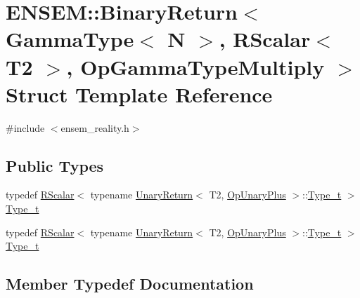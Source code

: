 \hypertarget{structENSEM_1_1BinaryReturn_3_01GammaType_3_01N_01_4_00_01RScalar_3_01T2_01_4_00_01OpGammaTypeMultiply_01_4}{}\section{E\+N\+S\+EM\+:\+:Binary\+Return$<$ Gamma\+Type$<$ N $>$, R\+Scalar$<$ T2 $>$, Op\+Gamma\+Type\+Multiply $>$ Struct Template Reference}
\label{structENSEM_1_1BinaryReturn_3_01GammaType_3_01N_01_4_00_01RScalar_3_01T2_01_4_00_01OpGammaTypeMultiply_01_4}


{\ttfamily \#include $<$ensem\+\_\+reality.\+h$>$}

\subsection*{Public Types}
\begin{DoxyCompactItemize}
\item 
typedef \mbox{\hyperlink{classENSEM_1_1RScalar}{R\+Scalar}}$<$ typename \mbox{\hyperlink{structENSEM_1_1UnaryReturn}{Unary\+Return}}$<$ T2, \mbox{\hyperlink{structENSEM_1_1OpUnaryPlus}{Op\+Unary\+Plus}} $>$\+::\mbox{\hyperlink{structENSEM_1_1BinaryReturn_3_01GammaType_3_01N_01_4_00_01RScalar_3_01T2_01_4_00_01OpGammaTypeMultiply_01_4_a943d82dee1746ec497924dece721a7d7}{Type\+\_\+t}} $>$ \mbox{\hyperlink{structENSEM_1_1BinaryReturn_3_01GammaType_3_01N_01_4_00_01RScalar_3_01T2_01_4_00_01OpGammaTypeMultiply_01_4_a943d82dee1746ec497924dece721a7d7}{Type\+\_\+t}}
\item 
typedef \mbox{\hyperlink{classENSEM_1_1RScalar}{R\+Scalar}}$<$ typename \mbox{\hyperlink{structENSEM_1_1UnaryReturn}{Unary\+Return}}$<$ T2, \mbox{\hyperlink{structENSEM_1_1OpUnaryPlus}{Op\+Unary\+Plus}} $>$\+::\mbox{\hyperlink{structENSEM_1_1BinaryReturn_3_01GammaType_3_01N_01_4_00_01RScalar_3_01T2_01_4_00_01OpGammaTypeMultiply_01_4_a943d82dee1746ec497924dece721a7d7}{Type\+\_\+t}} $>$ \mbox{\hyperlink{structENSEM_1_1BinaryReturn_3_01GammaType_3_01N_01_4_00_01RScalar_3_01T2_01_4_00_01OpGammaTypeMultiply_01_4_a943d82dee1746ec497924dece721a7d7}{Type\+\_\+t}}
\end{DoxyCompactItemize}


\subsection{Member Typedef Documentation}
\mbox{\label{structENSEM_1_1BinaryReturn_3_01GammaType_3_01N_01_4_00_01RScalar_3_01T2_01_4_00_01OpGammaTypeMultiply_01_4_a943d82dee1746ec497924dece721a7d7}} 
